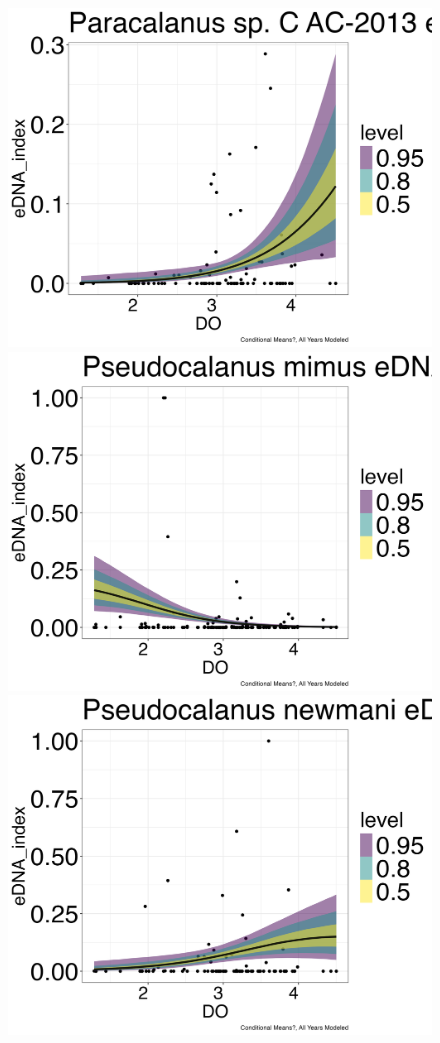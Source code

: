 \documentclass[12pt,twoside]{reedthesis}
\begin{document}
{\begin{figure}[h]
\begin{center}
			\includegraphics[scale=0.25]{Paracalanus_ZOIB_Means_Mod_noOut}
			\includegraphics[scale=0.25]{Pmimus_ZOIB_Means_Mod_noOut}
			\includegraphics[scale=0.25]{Pnewmani_ZOIB_Means_Mod_noOut}

\end{center}
\end{figure}}
\end{document}
